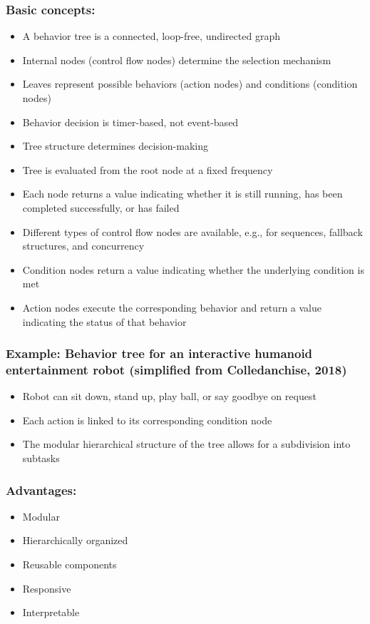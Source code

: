 \subsubsection*{Basic concepts:}
\begin{itemize}
    \item A behavior tree is a connected, loop-free, undirected graph
    \item Internal nodes (control flow nodes) determine the selection mechanism
    \item Leaves represent possible behaviors (action nodes) and conditions (condition nodes)
    \item Behavior decision is timer-based, not event-based
    \item Tree structure determines decision-making
    \item Tree is evaluated from the root node at a fixed frequency
    \item Each node returns a value indicating whether it is still running, has been completed successfully, or has failed
    \item Different types of control flow nodes are available, e.g., for sequences, fallback structures, and concurrency
    \item Condition nodes return a value indicating whether the underlying condition is met
    \item Action nodes execute the corresponding behavior and return a value indicating the status of that behavior
\end{itemize}

\subsubsection*{Example: Behavior tree for an interactive humanoid entertainment robot (simplified from Colledanchise, 2018)}
\begin{itemize}
    \item Robot can sit down, stand up, play ball, or say goodbye on request
    \item Each action is linked to its corresponding condition node
    \item The modular hierarchical structure of the tree allows for a subdivision into subtasks
\end{itemize}

\subsubsection*{Advantages:}
\begin{itemize}
    \item Modular
    \item Hierarchically organized
    \item Reusable components
    \item Responsive
    \item Interpretable
\end{itemize}

